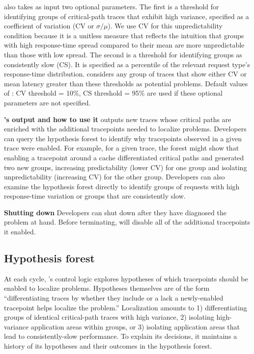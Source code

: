   \STAIF{} also takes as input two optional parameters.  
  The first is a threshold for identifying groups of critical-path
  traces that exhibit high variance, specified as a coefficient of
  variation (CV or $\sigma/\mu$).  We use CV for this unpredictability
  condition because it is a unitless measure that reflects the intuition
  that groups with high response-time spread compared to their mean are
  more unpredictable than those with low spread.  The second is a
  threshold for identifying groups as consistently slow (CS). It is
  specified as a percentile of the relevant request type's response-time
  distribution.  \STAIF{} considers any group of traces that show either
  CV or mean latency greater than these thresholds as potential
  problems.  Default values of : CV threshold = 10\%, CS threshold =
  95\% are used if these optional parameters are not specified.
  
  \noindent\textbf{\STAIF{}'s output and how to use it}
  \STAIF{} outputs new traces whose critical paths
  are enriched with the additional tracepoints needed to localize
  problems.  Developers can query the hypothesis forest to identify why
  tracepoints observed in a given trace were enabled.  For example, for
  a given trace, the forest might show that enabling a tracepoint around
  a cache differentiated critical paths and generated two new groups,
  increasing predictability (lower CV) for one group and isolating
  unpredictability (increasing CV) for the other group.  Developers can
  also examine the hypothesis forest directly to identify groups of
  requests with high response-time variation or groups that are
  consistently slow.
  
  \noindent\textbf{Shutting down \STAIF{}} Developers can shut down \STAIF{}
  after they have diagnosed the problem at hand.  Before
  terminating, \STAIF{} will disable all of the additional tracepoints
  it enabled.

  \subsection{Hypothesis forest}
\label{sec:design:control_logic}

At each cycle, \staif{}'s control logic explores hypotheses of which
tracepoints should be enabled to localize problems.  Hypotheses
themselves are of the form ``differentiating traces by whether they
include or a lack a newly-enabled tracepoint helps localize the
problem.''  Localization amounts to 1) differentiating groups of
identical critical-path traces with high variance, 2) isolating
high-variance application areas within groups, or 3) isolating
application areas that lead to consistently-slow performance.  To
explain its decisions, it maintains a history of its hypotheses and
their outcomes in the hypothesis forest.  

